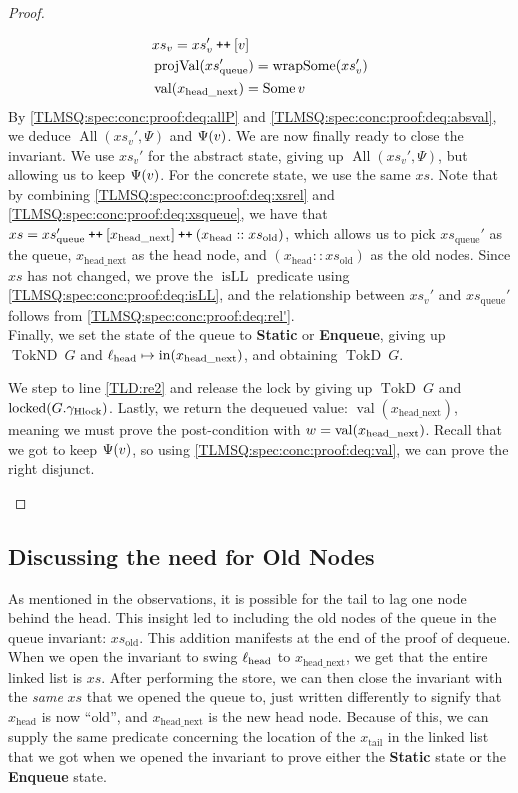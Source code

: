 \documentclass[a4paper, 10pt]{report}
\theoremstyle{definition}
\newcommand{\locked}{\operatorname{locked}}
\newcommand{\xsc}{xs}
\newcommand{\xsqueue}{xs_{\mathrm{queue}}}
\newcommand{\xsold}{xs_{\mathrm{old}}}
\newcommand{\isLL}{\operatorname{isLL}}
\newcommand{\AllP}{\operatorname{All}}
\newcommand{\projval}{\operatorname{projVal}}
\newcommand{\wrapsome}{\operatorname{wrapSome}}
\newcommand{\locN}[1]{\loc_{\mathrm{#1}}}
\newcommand{\lochead}{\locN{head}}
\newcommand{\nodeval}{\valB}
\newcommand{\nIn}[1]{\operatorname{in}(#1)}
\newcommand{\nVal}[1]{\operatorname{val}(#1)}
\newcommand{\node}{x}
\newcommand{\nodeN}[1]{\node_{\mathrm{#1}}}
\newcommand{\nodehead}{\nodeN{head}}
\newcommand{\nodetail}{\nodeN{tail}}
\newcommand{\nodeheadnext}{\nodeN{head\_next}}
\newcommand{\absvalue}{\val}
\newcommand{\absvalueList}{xs_v}
\newcommand{\StaticState}{\textbf{Static}\xspace}
\newcommand{\EnqueueState}{\textbf{Enqueue}\xspace}
\newcommand{\Qg}{G}
\newcommand{\ghlock}{\gname_{\mathrm{Hlock}}}
\newcommand{\TokD}[1]{\operatorname{TokD} ~ #1}
\newcommand{\TokDQg}{\TokD{\Qg}}
\newcommand{\TokND}[1]{\operatorname{TokND} ~ #1}
\newcommand{\TokNDQg}{\TokND{\Qg}}
\newcommand\catenate{\mathbin{\text{\ttfamily\upshape ++}}}
\begin{document}
\begin{proof}
\begin{itemize}
  \begin{align}
    &\absvalueList = \absvalueList' \catenate [\absvalue]\label{TLMSQ:spec:conc:proof:deq:absval}\\
    &\projval(\xsqueue') = \wrapsome(\absvalueList')\label{TLMSQ:spec:conc:proof:deq:rel'}\\
    &\nVal{\nodeheadnext} = \Some{\absvalue}\label{TLMSQ:spec:conc:proof:deq:val}
  \end{align}
  By \ref{TLMSQ:spec:conc:proof:deq:allP} and \ref{TLMSQ:spec:conc:proof:deq:absval}, we deduce $\AllP(\absvalueList', \Psi)$ and $\Psi(\absvalue)$. We are now finally ready to close the invariant. We use $\absvalueList'$ for the abstract state, giving up $\AllP(\absvalueList', \Psi)$, but allowing us to keep $\Psi(\absvalue)$. For the concrete state, we use the same $\xsc$. Note that by combining \ref{TLMSQ:spec:conc:proof:deq:xsrel} and \ref{TLMSQ:spec:conc:proof:deq:xsqueue}, we have that $\xsc = \xsqueue' \catenate [\nodeheadnext] \catenate (\nodehead :: \xsold)$, which allows us to pick $\xsqueue'$ as the queue, $\nodeheadnext$ as the head node, and $(\nodehead :: \xsold)$ as the old nodes. Since $\xsc$ has not changed, we prove the $\isLL$ predicate using \ref{TLMSQ:spec:conc:proof:deq:isLL}, and the relationship between $\absvalueList'$ and $\xsqueue'$ follows from \ref{TLMSQ:spec:conc:proof:deq:rel'}.\\
  Finally, we set the state of the queue to \StaticState or \EnqueueState, giving up $\TokNDQg$ and $\lochead \mapsto \nIn{\nodeheadnext}$, and obtaining $\TokDQg$.

  We step to line \ref{TLD:re2} and release the lock by giving up $\TokDQg$ and $\locked(\Qg.\ghlock)$. Lastly, we return the dequeued value: $\nVal{\nodeheadnext}$, meaning we must prove the post-condition with $\nodeval = \nVal{\nodeheadnext}$. Recall that we got to keep $\Psi(\absvalue)$, so using \ref{TLMSQ:spec:conc:proof:deq:val}, we can prove the right disjunct.
\end{itemize}
\end{proof}

\subsection{Discussing the need for Old Nodes}\label{TLMSQ:Discussion:xs_old}

As mentioned in the observations, it is possible for the tail to lag one node behind the head. This insight led to including the old nodes of the queue in the queue invariant: $\xsold$. This addition manifests at the end of the proof of dequeue. When we open the invariant to swing $\lochead$ to $\nodeheadnext$, we get that the entire linked list is $\xsc$. After performing the store, we can then close the invariant with the \emph{same} $\xsc$ that we opened the queue to, just written differently to signify that $\nodehead$ is now ``old'', and $\nodeheadnext$ is the new head node. Because of this, we can supply the same predicate concerning the location of the $\nodetail$ in the linked list that we got when we opened the invariant to prove either the \StaticState state or the \EnqueueState state.
\end{document}
